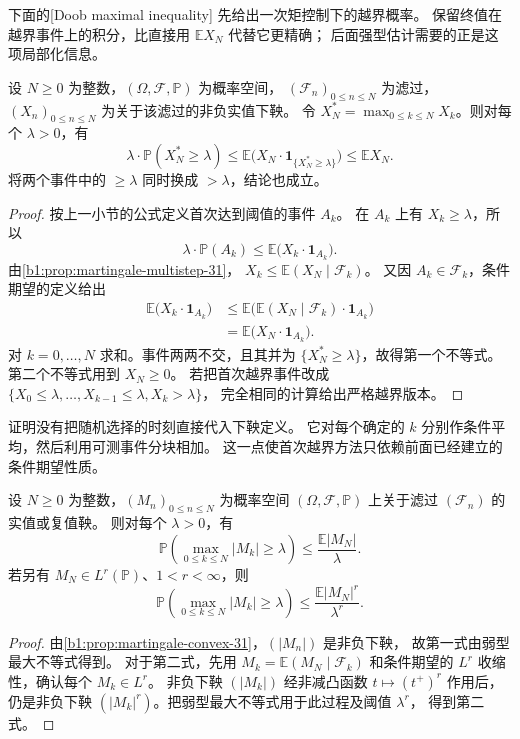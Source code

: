下面的[Doob maximal inequality]%
先给出一次矩控制下的越界概率。
保留终值在越界事件上的积分，比直接用 \(\mathbb E X_N\) 代替它更精确；
后面强型估计需要的正是这项局部化信息。

\begin{theorem}
\label{b1:thm:doob-weak-31}
设 \(N\geq0\) 为整数，\((\Omega,\mathcal F,\mathbb P)\) 为概率空间，
\((\mathcal F_n)_{0\leq n\leq N}\) 为滤过，
\((X_n)_{0\leq n\leq N}\) 为关于该滤过的非负实值下鞅。
令 \(X_N^*=\max_{0\leq k\leq N}X_k\)。则对每个 \(\lambda>0\)，有
\begin{equation}
 \lambda\cdot\mathbb P(X_N^*\geq\lambda)
 \leq\mathbb E\bigl(X_N\cdot\mathbf1_{\{X_N^*\geq\lambda\}}\bigr)
 \leq\mathbb E X_N.
 \label{b1:eq:doob-local-tail-31}
\end{equation}
将两个事件中的 \(\geq\lambda\) 同时换成 \(>\lambda\)，结论也成立。
\end{theorem}
\begin{proof}
按上一小节的公式定义首次达到阈值的事件 \(A_k\)。
在 \(A_k\) 上有 \(X_k\geq\lambda\)，所以
\[
 \lambda\cdot\mathbb P(A_k)
 \leq\mathbb E\bigl(X_k\cdot\mathbf1_{A_k}\bigr).
\]
由\cref{b1:prop:martingale-multistep-31}，
\(X_k\leq\mathbb E(X_N\mid\mathcal F_k)\)。
又因 \(A_k\in\mathcal F_k\)，条件期望的定义给出
\[
 \begin{aligned}
 \mathbb E\bigl(X_k\cdot\mathbf1_{A_k}\bigr)
 &\leq\mathbb E\bigl(\mathbb E(X_N\mid\mathcal F_k)
                         \cdot\mathbf1_{A_k}\bigr)\\
 &=\mathbb E\bigl(X_N\cdot\mathbf1_{A_k}\bigr).
 \end{aligned}
\]
对 \(k=0,\ldots,N\) 求和。事件两两不交，且其并为
\(\{X_N^*\geq\lambda\}\)，故得第一个不等式。
第二个不等式用到 \(X_N\geq0\)。
若把首次越界事件改成
\(\{X_0\leq\lambda,\ldots,X_{k-1}\leq\lambda,X_k>\lambda\}\)，
完全相同的计算给出严格越界版本。
\end{proof}

证明没有把随机选择的时刻直接代入下鞅定义。
它对每个确定的 \(k\) 分别作条件平均，然后利用可测事件分块相加。
这一点使首次越界方法只依赖前面已经建立的条件期望性质。

\begin{corollary}[鞅的最大概率估计]
\label{b1:cor:martingale-maximal-31}
设 \(N\geq0\) 为整数，\((M_n)_{0\leq n\leq N}\) 为概率空间 \((\Omega,\mathcal F,\mathbb P)\)
上关于滤过 \((\mathcal F_n)\) 的实值或复值鞅。
则对每个 \(\lambda>0\)，有
\[
 \mathbb P\left(\max_{0\leq k\leq N}|M_k|\geq\lambda\right)
 \leq\frac{\mathbb E|M_N|}{\lambda}.
\]
若另有 \(M_N\in L^r(\mathbb P)\)、\(1<r<\infty\)，则
\[
 \mathbb P\left(\max_{0\leq k\leq N}|M_k|\geq\lambda\right)
 \leq\frac{\mathbb E|M_N|^r}{\lambda^r}.
\]
\end{corollary}
\begin{proof}
由\cref{b1:prop:martingale-convex-31}，\((|M_n|)\) 是非负下鞅，
故第一式由弱型最大不等式得到。
对于第二式，先用 \(M_k=\mathbb E(M_N\mid\mathcal F_k)\)
和条件期望的 \(L^r\) 收缩性，确认每个 \(M_k\in L^r\)。
非负下鞅 \((|M_k|)\) 经非减凸函数 \(t\mapsto(t^+)^r\) 作用后，
仍是非负下鞅 \((|M_k|^r)\)。把弱型最大不等式用于此过程及阈值 \(\lambda^r\)，
得到第二式。
\end{proof}

